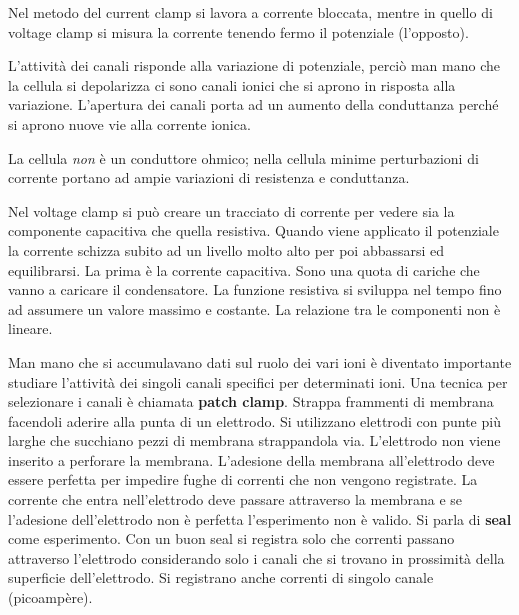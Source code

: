 \documentclass[]{article}
\begin{document}
Nel metodo del current clamp si lavora a corrente bloccata, mentre in
quello di voltage clamp si misura la corrente tenendo fermo il
potenziale (l'opposto).

L'attività dei canali risponde alla variazione di potenziale, perciò man
mano che la cellula si depolarizza ci sono canali ionici che si aprono
in risposta alla variazione. L'apertura dei canali porta ad un aumento
della conduttanza perché si aprono nuove vie alla corrente ionica.

La cellula \emph{non} è un conduttore ohmico; nella cellula minime
perturbazioni di corrente portano ad ampie variazioni di resistenza e
conduttanza.

Nel voltage clamp si può creare un tracciato di corrente per vedere sia
la componente capacitiva che quella resistiva. Quando viene applicato il
potenziale la corrente schizza subito ad un livello molto alto per poi
abbassarsi ed equilibrarsi. La prima è la corrente capacitiva. Sono una
quota di cariche che vanno a caricare il condensatore. La funzione
resistiva si sviluppa nel tempo fino ad assumere un valore massimo e
costante. La relazione tra le componenti non è lineare.

Man mano che si accumulavano dati sul ruolo dei vari ioni è diventato
importante studiare l'attività dei singoli canali specifici per
determinati ioni. Una tecnica per selezionare i canali è chiamata
\textbf{patch clamp}. Strappa frammenti di membrana facendoli aderire
alla punta di un elettrodo. Si utilizzano elettrodi con punte più larghe
che succhiano pezzi di membrana strappandola via. L'elettrodo non viene
inserito a perforare la membrana. L'adesione della membrana
all'elettrodo deve essere perfetta per impedire fughe di correnti che
non vengono registrate. La corrente che entra nell'elettrodo deve
passare attraverso la membrana e se l'adesione dell'elettrodo non è
perfetta l'esperimento non è valido. Si parla di \textbf{seal} come
esperimento. Con un buon seal si registra solo che correnti passano
attraverso l'elettrodo considerando solo i canali che si trovano in
prossimità della superficie dell'elettrodo. Si registrano anche correnti
di singolo canale (picoampère).
\end{document}

